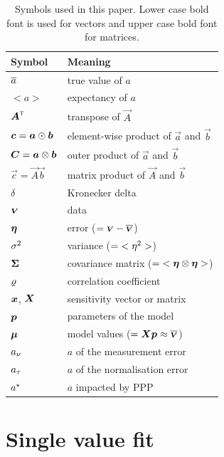 \documentclass{pasa}
\begin{document}
\begin{table}
\caption{Symbols used in this paper. Lower case bold font is used for vectors and upper case bold font for matrices.}
\begin{tabular}{ll}
\hline\hline
Symbol                        & Meaning\\
\hline
$\overline{a}$                     & true value of $a$\\
$<a>$                         & expectancy of $a$\\
${\boldsymbol{A}}^\text{\textsc{t}}$                 & transpose of $\vec A$\\
$\boldsymbol{c} = \boldsymbol{a}\odot\boldsymbol{b}$ & element-wise product of $\vec a$ and $\vec b$\\
$\boldsymbol{C} = \boldsymbol{a}\otimes\boldsymbol{b}$ & outer product of $\vec a$ and $\vec b$\\
$\vec c = \vec A\vec b$       & matrix product of $\vec A$ and $\vec b$\\
$\delta$                      & Kronecker delta\\
\hline
$\boldsymbol{{\scriptstyle V}}$                      & data\\ 
$\boldsymbol{\eta}$                     & error ($= \boldsymbol{{\scriptstyle V}} - \overline{\boldsymbol{{\scriptstyle V}}}$)\\
$\sigma^2$                      & variance ($=  {<\eta^2>} $)\\
$\boldsymbol{\Sigma}$                       & covariance matrix ($=  {<\boldsymbol{\eta}\otimes\boldsymbol{\eta}>} $)\\
$\varrho$                       & correlation coefficient\\
$\boldsymbol{x}$, $\boldsymbol{X}$            & sensitivity vector or matrix\\
$\boldsymbol{p}$                     & parameters of the model\\
$\boldsymbol{\mu}$                       & model values ($= \boldsymbol{X}\boldsymbol{p}\approx\overline{\boldsymbol{{\scriptstyle V}}}$)\\
\hline
$a_\nu$                      & $a$ of the measurement error\\
$a_\tau$                      & $a$ of the normalisation error\\
$a^\star$                      & $a$ impacted by PPP\\
\hline
\end{tabular}
\end{table}

\section{Single value fit}
\label{sec:single} 
\end{document}
